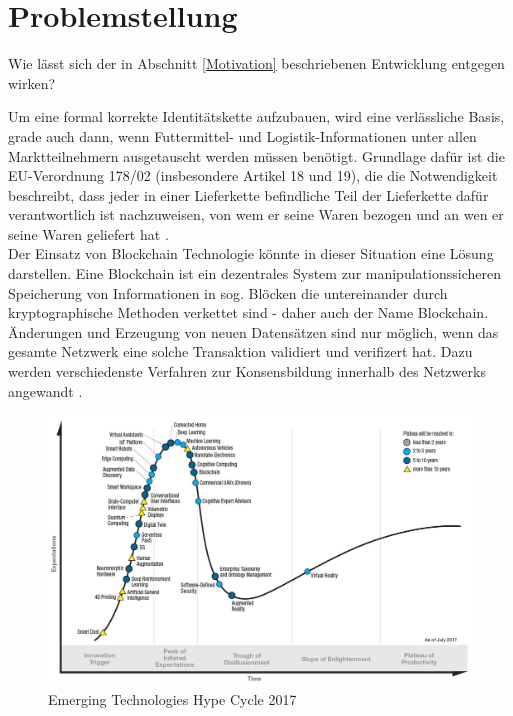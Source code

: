 \section{Problemstellung}

Wie lässt sich der in Abschnitt \ref{Motivation} beschriebenen Entwicklung entgegen wirken?

Um eine formal korrekte Identitätskette aufzubauen, wird eine verlässliche Basis, grade auch dann, wenn Futtermittel- und Logistik-Informationen unter allen Marktteilnehmern ausgetauscht werden müssen benötigt. Grundlage dafür ist die EU-Verordnung 178/02 (insbesondere Artikel 18 und 19), die die Notwendigkeit beschreibt, dass jeder in einer Lieferkette befindliche Teil der Lieferkette dafür verantwortlich ist nachzuweisen, von wem er seine Waren bezogen und an wen er seine Waren geliefert hat \citep{EPER2002}.\\

Der Einsatz von Blockchain Technologie könnte in dieser Situation eine Lösung darstellen. Eine Blockchain ist ein dezentrales System zur manipulationssicheren Speicherung von Informationen in sog. Blöcken die untereinander durch kryptographische Methoden verkettet sind - daher auch der Name Blockchain. Änderungen und Erzeugung von neuen Datensätzen sind nur möglich, wenn das gesamte Netzwerk eine solche Transaktion validiert und verifizert hat. Dazu werden verschiedenste Verfahren zur Konsensbildung innerhalb des Netzwerks angewandt \citep[siehe auch][]{Nakamoto2009, Buterin2014, Cardano2017, carVertical}.\\


\begin{figure}[h!]
	\centering
	\includegraphics[width=0.65\linewidth]{pictures/Gartner-Hype-Cycle-2017}
	\caption[Gartner Hype Cycle 2017]{Emerging Technologies Hype Cycle 2017\citep{Gartner2017}}
	\label{fig:gartner-hype-cycle-2017}
\end{figure}

